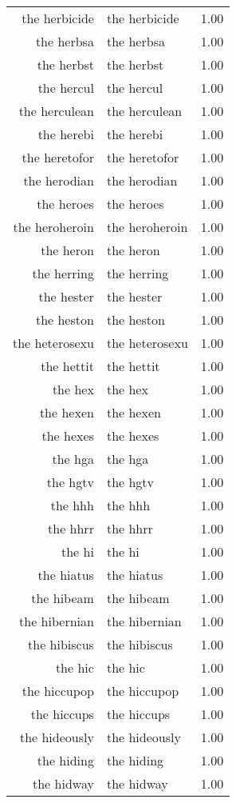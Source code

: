 \begin{table}[ht]
\begin{tabular}{rlr}
  the herbicide & the herbicide & 1.00 \\ 
  the herbsa & the herbsa & 1.00 \\ 
  the herbst & the herbst & 1.00 \\ 
  the hercul & the hercul & 1.00 \\ 
  the herculean & the herculean & 1.00 \\ 
  the herebi & the herebi & 1.00 \\ 
  the heretofor & the heretofor & 1.00 \\ 
  the herodian & the herodian & 1.00 \\ 
  the heroes & the heroes & 1.00 \\ 
  the heroheroin & the heroheroin & 1.00 \\ 
  the heron & the heron & 1.00 \\ 
  the herring & the herring & 1.00 \\ 
  the hester & the hester & 1.00 \\ 
  the heston & the heston & 1.00 \\ 
  the heterosexu & the heterosexu & 1.00 \\ 
  the hettit & the hettit & 1.00 \\ 
  the hex & the hex & 1.00 \\ 
  the hexen & the hexen & 1.00 \\ 
  the hexes & the hexes & 1.00 \\ 
  the hga & the hga & 1.00 \\ 
  the hgtv & the hgtv & 1.00 \\ 
  the hhh & the hhh & 1.00 \\ 
  the hhrr & the hhrr & 1.00 \\ 
  the hi & the hi & 1.00 \\ 
  the hiatus & the hiatus & 1.00 \\ 
  the hibeam & the hibeam & 1.00 \\ 
  the hibernian & the hibernian & 1.00 \\ 
  the hibiscus & the hibiscus & 1.00 \\ 
  the hic & the hic & 1.00 \\ 
  the hiccupop & the hiccupop & 1.00 \\ 
  the hiccups & the hiccups & 1.00 \\ 
  the hideously & the hideously & 1.00 \\ 
  the hiding & the hiding & 1.00 \\ 
  the hidway & the hidway & 1.00 \\ 

\end{tabular}
\end{table}
